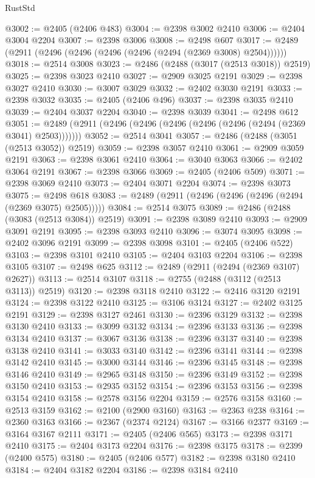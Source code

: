 \begin{lexlean}{RustStd}
\begin{coremodule}
@3002 := @2405 (@2406 @483)
@3004 := @2398 @3002 @2410
@3006 := @2404 @3004 @2204
@3007 := @2398 @3006
@3008 := @2498 @607
@3017 := @2489 (@2911 (@2496 (@2496 (@2496 (@2496 (@2494 (@2369 @3008) @2504))))))
@3018 := @2514 @3008
@3023 := @2486 (@2488 (@3017 (@2513 @3018)) @2519)
@3025 := @2398 @3023 @2410
@3027 := @2909 @3025 @2191
@3029 := @2398 @3027 @2410
@3030 := @3007 @3029
@3032 := @2402 @3030 @2191
@3033 := @2398 @3032
@3035 := @2405 (@2406 @496)
@3037 := @2398 @3035 @2410
@3039 := @2404 @3037 @2204
@3040 := @2398 @3039
@3041 := @2498 @612
@3051 := @2489 (@2911 (@2496 (@2496 (@2496 (@2496 (@2496 (@2494 (@2369 @3041) @2503)))))))
@3052 := @2514 @3041
@3057 := @2486 (@2488 (@3051 (@2513 @3052)) @2519)
@3059 := @2398 @3057 @2410
@3061 := @2909 @3059 @2191
@3063 := @2398 @3061 @2410
@3064 := @3040 @3063
@3066 := @2402 @3064 @2191
@3067 := @2398 @3066
@3069 := @2405 (@2406 @509)
@3071 := @2398 @3069 @2410
@3073 := @2404 @3071 @2204
@3074 := @2398 @3073
@3075 := @2498 @618
@3083 := @2489 (@2911 (@2496 (@2496 (@2496 (@2494 (@2369 @3075) @2505)))))
@3084 := @2514 @3075
@3089 := @2486 (@2488 (@3083 (@2513 @3084)) @2519)
@3091 := @2398 @3089 @2410
@3093 := @2909 @3091 @2191
@3095 := @2398 @3093 @2410
@3096 := @3074 @3095
@3098 := @2402 @3096 @2191
@3099 := @2398 @3098
@3101 := @2405 (@2406 @522)
@3103 := @2398 @3101 @2410
@3105 := @2404 @3103 @2204
@3106 := @2398 @3105
@3107 := @2498 @625
@3112 := @2489 (@2911 (@2494 (@2369 @3107) @2627))
@3113 := @2514 @3107
@3118 := @2755 (@2488 (@3112 (@2513 @3113)) @2519)
@3120 := @2398 @3118 @2410
@3122 := @2416 @3120 @2191
@3124 := @2398 @3122 @2410
@3125 := @3106 @3124
@3127 := @2402 @3125 @2191
@3129 := @2398 @3127 @2461
@3130 := @2396 @3129
@3132 := @2398 @3130 @2410
@3133 := @3099 @3132
@3134 := @2396 @3133
@3136 := @2398 @3134 @2410
@3137 := @3067 @3136
@3138 := @2396 @3137
@3140 := @2398 @3138 @2410
@3141 := @3033 @3140
@3142 := @2396 @3141
@3144 := @2398 @3142 @2410
@3145 := @3000 @3144
@3146 := @2396 @3145
@3148 := @2398 @3146 @2410
@3149 := @2965 @3148
@3150 := @2396 @3149
@3152 := @2398 @3150 @2410
@3153 := @2935 @3152
@3154 := @2396 @3153
@3156 := @2398 @3154 @2410
@3158 := @2578 @3156 @2204
@3159 := @2576 @3158
@3160 := @2513 @3159
@3162 := @2100 (@2900 @3160)
@3163 := @2363 @238
@3164 := @2360 @3163
@3166 := @2367 (@2374 @2124)
@3167 := @3166 @2377
@3169 := @3164 @3167 @2111
@3171 := @2405 (@2406 @565)
@3173 := @2398 @3171 @2410
@3175 := @2404 @3173 @2204
@3176 := @2398 @3175
@3178 := @2399 (@2400 @575)
@3180 := @2405 (@2406 @577)
@3182 := @2398 @3180 @2410
@3184 := @2404 @3182 @2204
@3186 := @2398 @3184 @2410

\end{coremodule}
\end{lexlean}
